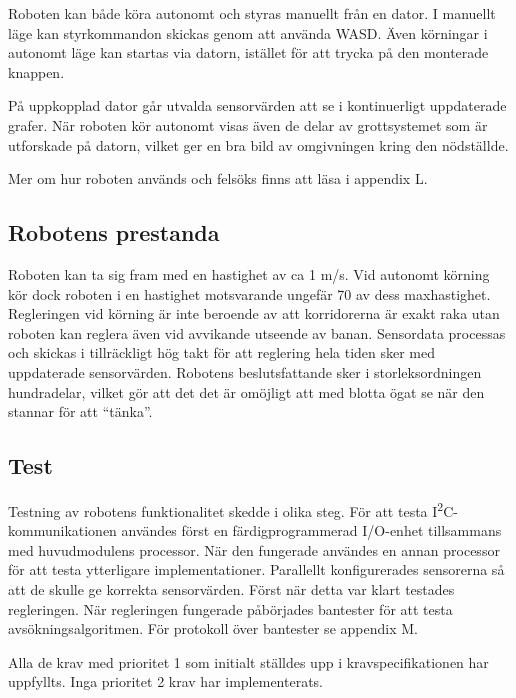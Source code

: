 \documentclass[11pt]{article}
\begin{document}
\begin{flushleft}

Roboten kan både köra autonomt och styras manuellt från en dator. I manuellt läge kan styrkommandon skickas genom att använda WASD. Även körningar i autonomt läge kan startas via datorn, istället för att trycka på den monterade knappen. 

På uppkopplad dator går utvalda sensorvärden att se i kontinuerligt uppdaterade grafer. När roboten kör autonomt visas även de delar av grottsystemet som är utforskade på datorn, vilket ger en bra bild av omgivningen kring den nödställde.

Mer om hur roboten används och felsöks finns att läsa i appendix L.

\subsection{Robotens prestanda}
Roboten kan ta sig fram med en hastighet av ca 1 m/s. Vid autonomt körning kör dock roboten i en hastighet motsvarande ungefär 70 av dess maxhastighet. Regleringen vid körning är inte beroende av att korridorerna är exakt raka utan roboten kan reglera även vid avvikande utseende av banan. Sensordata processas och skickas i tillräckligt hög takt för att reglering hela tiden sker med uppdaterade sensorvärden. Robotens beslutsfattande sker i storleksordningen hundradelar, vilket gör att det det är omöjligt att med blotta ögat se när den stannar för att ``tänka''. %

\subsection{Test}
Testning av robotens funktionalitet skedde i olika steg. För att testa I\textsuperscript{2}C-kommunikationen användes först en färdigprogrammerad I/O-enhet tillsammans med huvudmodulens processor. När den fungerade användes en annan processor för att testa ytterligare implementationer. Parallellt konfigurerades sensorerna så att de skulle ge korrekta sensorvärden. Först när detta var klart testades regleringen. När regleringen fungerade påbörjades bantester för att testa avsökningsalgoritmen. För protokoll över bantester se appendix M. 

Alla de krav med prioritet 1 som initialt ställdes upp i kravspecifikationen har uppfyllts. Inga prioritet 2 krav har implementerats.


\end{flushleft}
\end{document}
